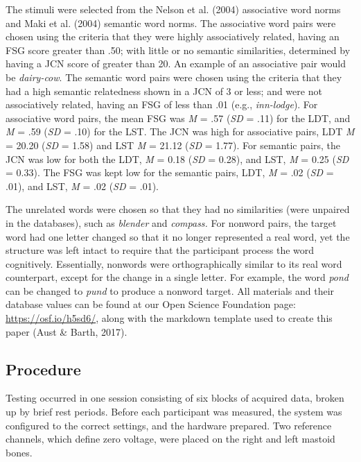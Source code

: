 \documentclass[english,man]{apa6}
\theoremstyle{definition}
\theoremstyle{definition}
\theoremstyle{definition}
\theoremstyle{remark}
\begin{document}
The stimuli were selected from the Nelson et al. (2004) associative word
norms and Maki et al. (2004) semantic word norms. The associative word
pairs were chosen using the criteria that they were highly associatively
related, having an FSG score greater than .50; with little or no
semantic similarities, determined by having a JCN score of greater than
20. An example of an associative pair would be \emph{dairy-cow}. The
semantic word pairs were chosen using the criteria that they had a high
semantic relatedness shown in a JCN of 3 or less; and were not
associatively related, having an FSG of less than .01 (e.g.,
\emph{inn-lodge}). For associative word pairs, the mean FSG was \emph{M}
= .57 (\emph{SD} = .11) for the LDT, and \emph{M} = .59 (\emph{SD} =
.10) for the LST. The JCN was high for associative pairs, LDT \emph{M} =
20.20 (\emph{SD} = 1.58) and LST \emph{M} = 21.12 (\emph{SD} = 1.77).
For semantic pairs, the JCN was low for both the LDT, \emph{M} = 0.18
(\emph{SD} = 0.28), and LST, \emph{M} = 0.25 (\emph{SD} = 0.33). The FSG
was kept low for the semantic pairs, LDT, \emph{M} = .02 (\emph{SD} =
.01), and LST, \emph{M} = .02 (\emph{SD} = .01).

The unrelated words were chosen so that they had no similarities (were
unpaired in the databases), such as \emph{blender} and \emph{compass.}
For nonword pairs, the target word had one letter changed so that it no
longer represented a real word, yet the structure was left intact to
require that the participant process the word cognitively. Essentially,
nonwords were orthographically similar to its real word counterpart,
except for the change in a single letter. For example, the word
\emph{pond} can be changed to \emph{pund} to produce a nonword target.
All materials and their database values can be found at our Open Science
Foundation page: \url{https://osf.io/h5sd6/}, along with the markdown
template used to create this paper (Aust \& Barth, 2017).

\subsection{Procedure}\label{procedure}

Testing occurred in one session consisting of six blocks of acquired
data, broken up by brief rest periods. Before each participant was
measured, the system was configured to the correct settings, and the
hardware prepared. Two reference channels, which define zero voltage,
were placed on the right and left mastoid bones.
\end{document}
